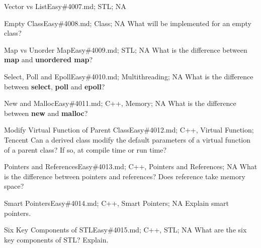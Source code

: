 \documentclass[oldfontcommands]{memoir}
\begin{document}
{\begin{question}{Vector vs List}{Easy}{\#4007.md; STL; NA}
\end{question}

\begin{question}{Empty Class}{Easy}{\#4008.md; Class; NA}
What will be implemented for an empty class?

\end{question}

\begin{question}{Map vs Unorder Map}{Easy}{\#4009.md; STL; NA}
What is the difference between {\bf{map}} and {\bf{unordered map}}?

\end{question}

\begin{question}{Select, Poll and Epoll}{Easy}{\#4010.md; Multithreading; NA}
What is the difference between {\bf{select}}, {\bf{poll}} and {\bf{epoll}}?

\end{question}

\begin{question}{New and Malloc}{Easy}{\#4011.md; C++, Memory; NA}
What is the difference between {\bf{new}} and {\bf{malloc}}?

\end{question}

\begin{question}{Modify Virtual Function of Parent Class}{Easy}{\#4012.md; C++, Virtual Function; Tencent}
Can a derived class modify the default parameters of a virtual function of a parent class? If so, at compile time or run time?

\end{question}

\begin{question}{Pointers and References}{Easy}{\#4013.md; C++, Pointers and References; NA}
What is the difference between pointers and references? Does reference take memory space?

\end{question}

\begin{question}{Smart Pointers}{Easy}{\#4014.md; C++, Smart Pointers; NA}
Explain smart pointers.

\end{question}

\begin{question}{Six Key Components of STL}{Easy}{\#4015.md; C++, STL; NA}
What are the six key components of STL? Explain.

\end{question}

}
\end{document}
